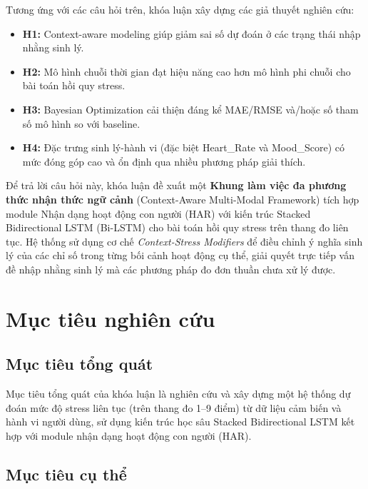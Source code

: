 Tương ứng với các câu hỏi trên, khóa luận xây dựng các giả thuyết nghiên cứu:

\begin{itemize}
    \item \textbf{H1:} Context-aware modeling giúp giảm sai số dự đoán ở các trạng thái nhập nhằng sinh lý.
    \item \textbf{H2:} Mô hình chuỗi thời gian đạt hiệu năng cao hơn mô hình phi chuỗi cho bài toán hồi quy stress.
    \item \textbf{H3:} Bayesian Optimization cải thiện đáng kể MAE/RMSE và/hoặc số tham số mô hình so với baseline.
    \item \textbf{H4:} Đặc trưng sinh lý-hành vi (đặc biệt Heart\_Rate và Mood\_Score) có mức đóng góp cao và ổn định qua nhiều phương pháp giải thích.
\end{itemize}

Để trả lời câu hỏi này, khóa luận đề xuất một \textbf{Khung làm việc đa phương thức nhận thức ngữ cảnh} (Context-Aware Multi-Modal Framework) tích hợp module Nhận dạng hoạt động con người (HAR) với kiến trúc Stacked Bidirectional LSTM (Bi-LSTM) \cite{hochreiter1997lstm, schuster1997bidirectional} cho bài toán hồi quy stress trên thang đo liên tục. Hệ thống sử dụng cơ chế \textit{Context-Stress Modifiers} để điều chỉnh ý nghĩa sinh lý của các chỉ số trong từng bối cảnh hoạt động cụ thể, giải quyết trực tiếp vấn đề nhập nhằng sinh lý mà các phương pháp đo đơn thuần chưa xử lý được.


\section{Mục tiêu nghiên cứu}
\label{sec:muc_tieu}

\subsection{Mục tiêu tổng quát}

Mục tiêu tổng quát của khóa luận là nghiên cứu và xây dựng một hệ thống dự đoán mức độ stress liên tục (trên thang đo 1--9 điểm) từ dữ liệu cảm biến và hành vi người dùng, sử dụng kiến trúc học sâu Stacked Bidirectional LSTM kết hợp với module nhận dạng hoạt động con người (HAR).

\subsection{Mục tiêu cụ thể}

